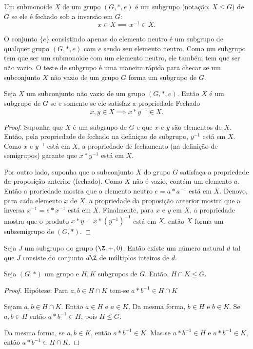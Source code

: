          \begin{definition}[Subgrupos]
            Um submonoide $X$ de um grupo $(G,*,e)$ é um subgrupo (notação: $X \leq G$) de $G$ se ele é fechado sob a inversão em $G$:
            $$x\in X \implies x^{-1} \in X.$$
         \end{definition}
         O conjunto $\{e\}$ consistindo apenas do elemento neutro é um subgrupo de qualquer grupo $(G,*,e)$ com $e$ sendo seu elemento neutro. Como um subgrupo tem que ser um submonoide com um elemento neutro, ele também tem que ser não vazio. O teste de subgrupo é uma maneira rápida para checar se um subconjunto $X$ não vazio de um grupo $G$ forma um subgrupo de $G$.
         \begin{stat}
            Seja $X$ um subconjunto não vazio de um grupo $(G,*,e)$. Então $X$ é um subgrupo de $G$ se e somente se ele satisfaz a propriedade Fechado
            $$x,y \in X \implies x*y^{-1} \in X.$$
            \begin{proof}
               Suponha que $X$ é um subgrupo de $G$ e que $x$ e $y$ são elementos de $X$. Então, pela propriedade de fechado na definiçao de subgrupo, $y^{-1}$ está em $X$. Como $x$ e $y^{-1}$ está em $X$, a propriedade de fechamento (na definição de semigrupos) garante que $x*y^{-1}$ está em $X$.

               Por outro lado, suponha que o subconjunto $X$ do grupo $G$ satisfaça a propriedade da proposição anterior (fechado). Como $X$ não é vazio, contém um elemento $a$. Então a proriedade mostra que o elemento neutro $e = a * a^{-1}$ está em $X$. Denovo, para cada elemento $x$ de $X$, a propriedade da proposição anterior mostra que a inversa $x^{-1} = e * x^{-1}$ está em $X$. Finalmente, para $x$ e $y$ em $X$, a propriedade mostra que o produto $x*y=x*(y^{-1})^{-1}$ está em $X$, então $X$ forma um subsemigrupo de $(G,*)$.
            \end{proof}
         \end{stat}
         \begin{theorem}
            Seja $J$ um subgrupo do grupo $(\Z,+,0)$. Então existe um número natural $d$ tal que $J$ consiste do conjunto $d\Z$ de múltiplos inteiros de $d$.
         \end{theorem}
         \begin{theorem}
            Seja $(G,*)$ um grupo e $H,K$ subgrupos de $G$. Então, $H\cap K \leq G$.
            \begin{proof}
               Hipótese: Para $a,b \in H \cap K$ tem-se $a * b^{-1} \in H \cap K$

               Sejam $a,b \in H \cap K$. Então $a \in H$ e $a \in K$. Da mesma forma, $b \in H$ e $b \in K$. Se $a,b \in H$ então $a * b^{-1} \in H$, pois $H \leq G$.

               Da mesma forma, se $a,b \in K$, então $a * b^{-1} \in K$. Mas se $a * b^{-1} \in H$ e $a * b^{-1} \in K$, então $a * b^{-1} \in H \cap K$.
            \end{proof}
         \end{theorem}
